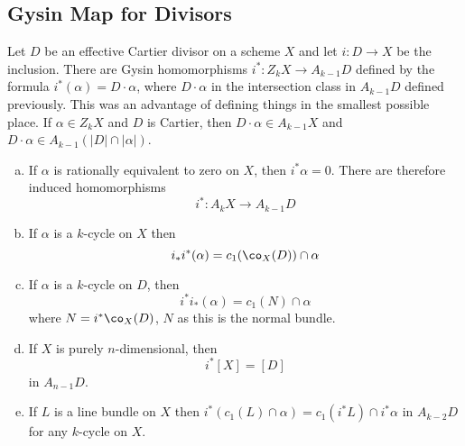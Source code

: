 \subsection{Gysin Map for Divisors}


Let $D$ be an effective Cartier divisor on a scheme $X$ and let $i: D \to X$ be the inclusion. There are  Gysin homomorphisms $i^*: Z_k X \to A_{k-1}D$ defined by the formula $i^*(\alpha)=D \cdot \alpha$, where $D \cdot \alpha$ in the intersection class in $A_{k-1}D$ defined previously. This was an advantage of defining things in the smallest possible place. If $\alpha \in Z_k X$ and $D$ is Cartier, then $D \cdot \alpha \in A_{k-1}X$ and $D\cdot \alpha \in A_{k-1}(|D| \cap |\alpha|)$.

\begin{prop}
\begin{enumerate}[(a)]
\item If $\alpha$ is rationally equivalent to zero on $X$, then $i^*\alpha=0$. There are therefore induced homomorphisms 
	\[
	i^*: A_kX \to A_{k-1}D
	\]
\item If $\alpha$ is a $k$-cycle on $X$ then
	\[
	i_* i^*(\alpha)= c_1(\co_X(D)) \cap \alpha
	\]
\item If $\alpha$ is a $k$-cycle on $D$, then
	\[
	i^*i_*(\alpha)= c_1(N) \cap \alpha
	\]
where $N=i^*\co_X(D)$, $N$ as this is the normal bundle.
\item If $X$ is purely $n$-dimensional, then	
	\[
	i^*[X]=[D]
	\]
in $A_{n-1}D$.
\item If $L$ is a line bundle on $X$ then $i^*(c_1(L) \cap \alpha)= c_1(i^*L) \cap i^*\alpha$ in $A_{k-2}D$ for any $k$-cycle on $X$.
\end{enumerate}
\end{prop}


